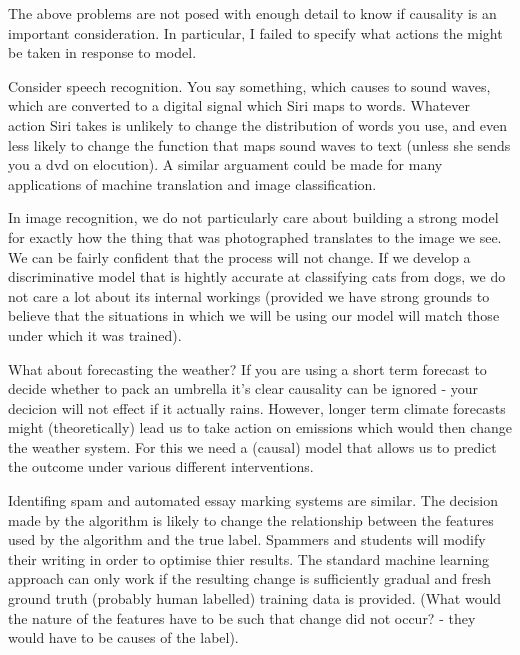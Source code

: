 \documentclass[11pt,a4paper,oneside]{book}
\begin{document}
The above problems are not posed with enough detail to know if causality is an important consideration. In particular, I failed to specify what actions the might be taken in response to model.

Consider speech recognition. You say something, which causes to sound waves, which are converted to a digital signal which Siri maps to words. Whatever action Siri takes is unlikely to change the distribution of words you use, and even less likely to change the function that maps sound waves to text (unless she sends you a dvd on elocution). A similar arguament could be made for many applications of machine translation and image classification. 

In image recognition, we do not particularly care about building a strong model for exactly how the thing that was photographed translates to the image we see. We can be fairly confident that the process will not change. If we develop a discriminative model that is hightly accurate at classifying cats from dogs, we do not care a lot about its internal workings (provided we have strong grounds to believe that the situations in which we will be using our model will match those under which it was trained).

What about forecasting the weather? If you are using a short term forecast to decide whether to pack an umbrella it's clear causality can be ignored - your decicion will not effect if it actually rains. However, longer term climate forecasts might (theoretically) lead us to take action on emissions which would then change the weather system. For this we need a (causal) model that allows us to predict the outcome under various different interventions.

Identifing spam and automated essay marking systems are similar. The decision made by the algorithm is likely to change the relationship between the features used by the algorithm and the true label. Spammers and students will modify their writing in order to optimise thier results. The standard machine learning approach can only work if the resulting change is sufficiently gradual and fresh ground truth (probably human labelled) training data is provided. (What would the nature of the features have to be such that change did not occur? - they would have to be causes of the label). 
\end{document}
